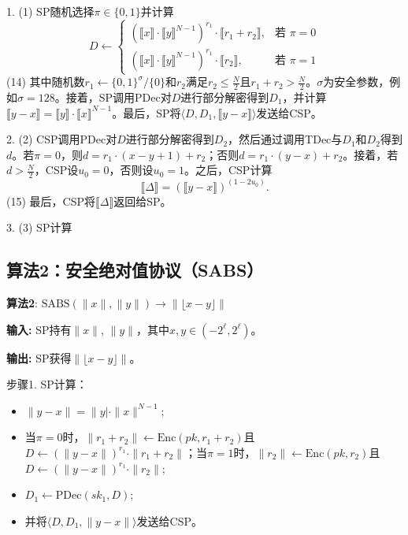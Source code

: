1. (1) SP随机选择\(\pi\in\{0,1\}\)并计算
   \[
   D\leftarrow\begin{cases}
   \left(\llbracket x\rrbracket\cdot\llbracket y\rrbracket^{N-1}\right)^{r_{1}}\cdot\llbracket r_{1}+r_{2}\rrbracket, & \text{若 }\pi=0 \\
   \left(\llbracket x\rrbracket\cdot\llbracket y\rrbracket^{N-1}\right)^{r_{1}}\cdot\llbracket r_{2}\rrbracket, & \text{若 }\pi=1
   \end{cases}
   \]
   (14)
   其中随机数\(r_{1}\leftarrow\{0,1\}^{\sigma}/\{0\}\)和\(r_{2}\)满足\(r_{2}\leq\frac{N}{2}\)且\(r_{1}+r_{2}>\frac{N}{2}\)。\(\sigma\)为安全参数，例如\(\sigma=128\)。接着，SP调用PDec对\(D\)进行部分解密得到\(D_{1}\)，并计算\(\llbracket y-x\rrbracket=\llbracket y\rrbracket\cdot\llbracket x\rrbracket^{N-1}\)。最后，SP将\(\langle D,D_{1},\llbracket y-x\rrbracket\rangle\)发送给CSP。

2. (2) CSP调用PDec对\(D\)进行部分解密得到\(D_{2}\)，然后通过调用TDec与\(D_{1}\)和\(D_{2}\)得到\(d\)。若\(\pi=0\)，则\(d=r_{1}\cdot(x-y+1)+r_{2}\)；否则\(d=r_{1}\cdot(y-x)+r_{2}\)。接着，若\(d>\frac{N}{2}\)，CSP设\(u_{0}=0\)，否则设\(u_{0}=1\)。之后，CSP计算
   \[
   \llbracket\Delta\rrbracket=(\llbracket y-x\rrbracket)^{(1-2u_{0})}.
   \]
   (15)
   最后，CSP将\(\llbracket\Delta\rrbracket\)返回给SP。

3. (3) SP计算

\subsection{算法2：安全绝对值协议（SABS）}
\textbf{算法2}: \(\text{SABS}(\|x\|,\|y\|)\to\|\lfloor x-y\rfloor\|\)

\textbf{输入:} SP持有\(\|x\|\), \(\|y\|\)，其中\(x,y\in(-2^{\ell},2^{\ell})\)。

\textbf{输出:} SP获得\(\|\lfloor x-y\rfloor\|\)。

步骤1. SP计算：

\begin{itemize}[leftmargin=*, nosep]
  \item \(\|y-x\|=\|y|\cdot\|x\|^{N-1}\);
  \item 当\(\pi=0\)时，\(\|r_{1}+r_{2}\|\leftarrow\text{Enc}(pk,r_{1}+r_{2})\)且\(D\leftarrow(\|y-x\|)^{r_{1}}\cdot\|r_{1}+r_{2}\|\)；当\(\pi=1\)时，\(\|r_{2}\|\leftarrow\text{Enc}(pk,r_{2})\)且\(D\leftarrow(\|y-x\|)^{r_{1}}\cdot\|r_{2}\|\);
  \item \(D_{1}\leftarrow\text{PDec}(sk_{1},D)\);
  \item 并将\(\langle D,D_{1},\|y-x\|\rangle\)发送给CSP。
\end{itemize}

